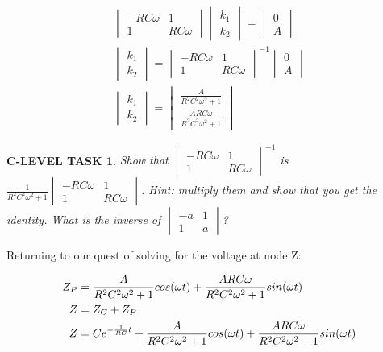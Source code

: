 \documentclass{book}
\numberwithin{equation}{section}
\newtheorem{clevel}{C-LEVEL TASK}
\theoremstyle{definition}
\begin{document}
\begin{align}
\begin{vmatrix}-RC\omega&1\\1&RC\omega \end{vmatrix}
\begin{vmatrix}k_1\\k_2 \end{vmatrix} = \begin{vmatrix}0\\A \end{vmatrix}\\
\begin{vmatrix}k_1\\k_2 \end{vmatrix} = \begin{vmatrix}-RC\omega&1\\1&RC\omega \end{vmatrix}^{-1}
\begin{vmatrix}0\\A \end{vmatrix}\\
\begin{vmatrix}k_1\\k_2 \end{vmatrix} = 
\begin{vmatrix}\frac{A}{R^2C^2\omega^2+1}\\ \frac{ARC\omega}{R^2C^2\omega^2+1} \end{vmatrix}
\end{align}

\begin{clevel}
Show that $\begin{vmatrix}-RC\omega&1\\1&RC\omega \end{vmatrix}^{-1}$ is 
$\frac{1}{R^2C^2\omega^2+1}\begin{vmatrix}-RC\omega&1\\1&RC\omega \end{vmatrix}$. Hint: multiply them and show that you get the identity. What is the inverse of $\begin{vmatrix}-a&1\\1&a \end{vmatrix}$?
\end{clevel}

Returning to our quest of solving for the voltage at node Z:

\begin{align}
Z_P&=\frac{A}{R^2C^2\omega^2+1}cos(\omega t)+\frac{ARC\omega}{R^2C^2\omega^2+1}sin(\omega t) \notag\\
Z&=Z_C+Z_P \notag\\
Z&=Ce^{-\frac{1}{RC}t}+
	\frac{A}{R^2C^2\omega^2+1}cos(\omega t)+\frac{ARC\omega}{R^2C^2\omega^2+1}sin(\omega t)
\label{E:8Z}
\end{align}
\end{document}
